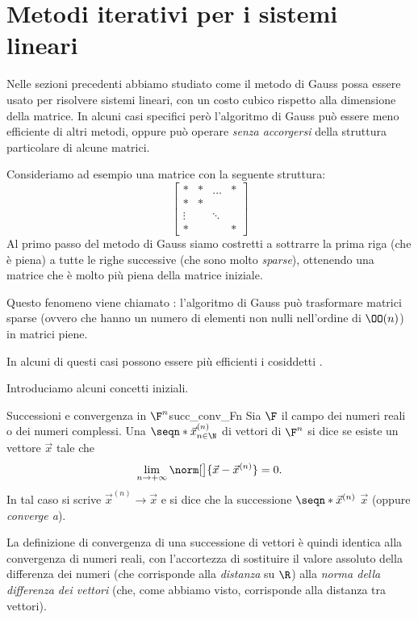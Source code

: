 \section{Metodi iterativi per i sistemi lineari}

Nelle sezioni precedenti abbiamo studiato come il metodo di Gauss possa essere usato per risolvere sistemi lineari, con un costo cubico rispetto alla dimensione della matrice. In alcuni casi specifici però l'algoritmo di Gauss può essere meno efficiente di altri metodi, oppure può operare \emph{senza accorgersi} della struttura particolare di alcune matrici.

Consideriamo ad esempio una matrice con la seguente struttura: \[
    \begin{bmatrix}
        \ast & \ast &\dots &\ast \\
        \ast & \ast &      &     \\
        \vdots &    & \ddots &   \\
        \ast &      &      &\ast
    \end{bmatrix}
\] Al primo passo del metodo di Gauss siamo costretti a sottrarre la prima riga (che è piena) a tutte le righe successive (che sono molto \emph{sparse}), ottenendo una matrice che è molto più piena della matrice iniziale.

Questo fenomeno viene chiamato : l'algoritmo di Gauss può trasformare matrici sparse (ovvero che hanno un numero di elementi non nulli nell'ordine di $\OO(n)$) in matrici piene.

In alcuni di questi casi possono essere più efficienti i cosiddetti .

Introduciamo alcuni concetti iniziali.

\begin{definition}
    {Successioni e convergenza in $\F^n$}{succ_conv_Fn}
    Sia $\F$ il campo dei numeri reali o dei numeri complessi. Una  $\seqn*{\vec x^{(n)}}_{n \in \N}$ di vettori di $\F^n$ si dice  se esiste un vettore $\vec x$ tale che \[
        \lim_{n \to +\infty} \norm[\big]{\vec x - \vec x^{(n)}} = 0.
    \] In tal caso si scrive $\vec x^{(n)} \to \vec x$ e si dice che la successione $\seqn*{\vec x^{(n)}}$  $\vec x$ (oppure \emph{converge a}).  
\end{definition}

La definizione di convergenza di una successione di vettori è quindi identica alla convergenza di numeri reali, con l'accortezza di sostituire il valore assoluto della differenza dei numeri (che corrisponde alla \emph{distanza} su $\R$) alla \emph{norma della differenza dei vettori} (che, come abbiamo visto, corrisponde alla distanza tra vettori).

